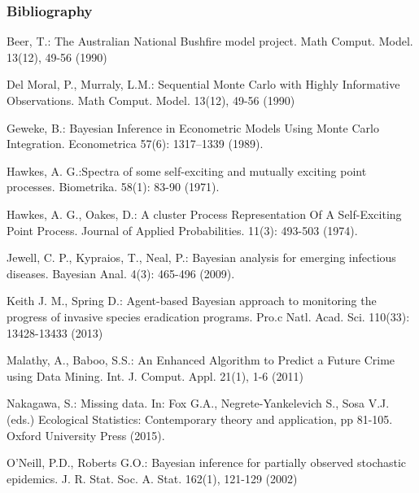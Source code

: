 \documentclass[9pt, xcolor={dvipsnames,svgnames,table}]{beamer}
\begin{document}
\begin{frame}[shrink=15]
\frametitle{Bibliography}
\begin{thebibliography}{}

{\small {} 
Beer, T.: The Australian National Bushfire model project. Math Comput. Model. 13(12), 49-56 (1990)

Del Moral, P., Murraly, L.M.: Sequential Monte Carlo with Highly Informative Observations. Math Comput. Model. 13(12), 49-56 (1990)

Geweke, B.: Bayesian Inference in Econometric Models Using Monte Carlo Integration. Econometrica 57(6): 1317–1339 (1989).

 Hawkes, A. G.:Spectra of some self-exciting and mutually exciting point processes. Biometrika. 58(1): 83-90 (1971).

 Hawkes, A. G., Oakes, D.: A cluster Process Representation Of A Self-Exciting Point Process. Journal of Applied Probabilities. 11(3): 493-503 (1974).

 Jewell, C. P., Kypraios, T., Neal, P.: Bayesian analysis for emerging infectious diseases. Bayesian Anal. 4(3): 465-496 (2009).

Keith J. M., Spring D.: Agent-based Bayesian approach to monitoring the progress of invasive species eradication programs. Pro.c Natl. Acad. Sci. 110(33): 13428-13433 (2013)

Malathy, A., Baboo, S.S.: An Enhanced Algorithm to Predict a Future Crime using Data Mining. Int. J. Comput. Appl. 21(1), 1-6 (2011)

Nakagawa, S.: Missing data. In: Fox G.A., Negrete-Yankelevich S., Sosa V.J. (eds.) Ecological Statistics: Contemporary theory and application, pp 81-105. Oxford University Press (2015). 

O'Neill, P.D., Roberts G.O.: Bayesian inference for partially observed stochastic epidemics. J. R. Stat. Soc. A. Stat. 162(1), 121-129 (2002)

}
\end{thebibliography}
\end{frame}
\end{document}
